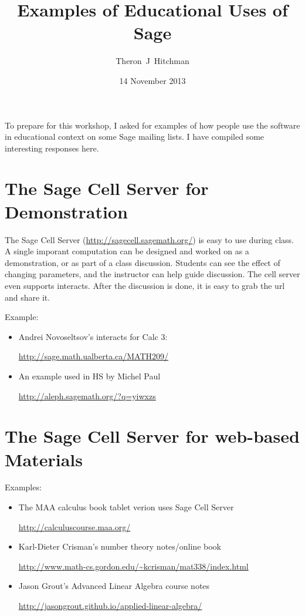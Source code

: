 \documentclass{article}
\title{Examples of Educational Uses of Sage}
\author{Theron~J~Hitchman}
\date{14 November 2013}
\begin{document}
\maketitle

To prepare for this workshop, I asked for examples of how people use the software in educational context on some Sage mailing lists.
I have compiled some interesting responses here.

\section{The Sage Cell Server for Demonstration}

The Sage Cell Server (\url{http://sagecell.sagemath.org/}) is easy to use during class. A single imporant computation can be designed and worked on as a demonstration, or as part of a class discussion.
Students can see the effect of changing parameters, and the instructor can help guide discussion.
The cell server even supports interacts.
After the discussion is done, it is easy to grab the url and share it.

Example:
\begin{itemize}
\item Andrei Novoseltsov's interacts for Calc 3:

\url{http://sage.math.ualberta.ca/MATH209/}

\item An example used in HS by Michel Paul

\url{http://aleph.sagemath.org/?q=yiwxzs}

\end{itemize}

\section{The Sage Cell Server for web-based Materials}

Examples:
\begin{itemize}
\item The MAA calculus book tablet verion uses Sage Cell Server

\url{http://calculuscourse.maa.org/}

\item Karl-Dieter Crisman's number theory notes/online book

\url{http://www.math-cs.gordon.edu/~kcrisman/mat338/index.html}

\item Jason Grout's Advanced Linear Algebra course notes

\url{http://jasongrout.github.io/applied-linear-algebra/}

\end{itemize}
\end{document}
